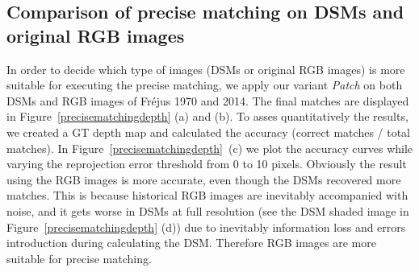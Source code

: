 \subsection{Comparison of precise matching on \ac{DSM}s and original RGB images}
\label{CompareRGBDSM}
In order to decide which type of images (\ac{DSM}s or original RGB images) is more suitable for executing the precise matching, we apply our variant \textit{Patch} on both \ac{DSM}s and RGB images of Fr{\'e}jus 1970 and 2014.
The final matches are displayed in Figure~\ref{precisematchingdepth} (a) and (b). 
To asses quantitatively the results, we created a \ac{GT} depth map and calculated the accuracy (correct matches / total matches). In Figure~\ref{precisematchingdepth}~(c) we plot the accuracy curves while varying the reprojection error threshold from 0 to 10 pixels. 
Obviously the result using the RGB images is more accurate, even though the \ac{DSM}s recovered more matches.
This is because historical RGB images are inevitably accompanied with noise, and it gets worse in \ac{DSM}s at full resolution (see the DSM shaded image in Figure~\ref{precisematchingdepth} (d)) due to inevitably information loss and errors introduction during calculating the \ac{DSM}. Therefore RGB images are more suitable for precise matching.\\
